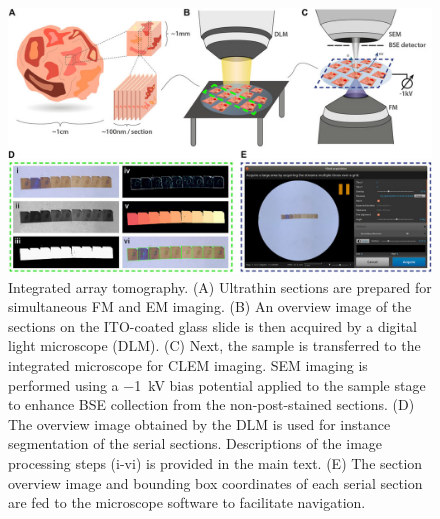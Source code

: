 \begin{figure}[!tb]
    \centering
    \includegraphics[width=\linewidth]{chapter-3/figures_JPEG_LQ/fig3-1_workflow.jpg}
    \caption{Integrated array tomography.
    (A) Ultrathin sections are prepared for simultaneous FM and EM imaging.
    (B) An overview image of the sections on the ITO-coated glass slide is then acquired by a digital light microscope (DLM).
    (C) Next, the sample is transferred to the integrated microscope for CLEM imaging. SEM imaging is performed using a \SI{-1}{\kilo\volt} bias potential applied to the sample stage to enhance BSE collection from the non-post-stained sections.
    (D) The overview image obtained by the DLM is used for instance segmentation of the serial sections. Descriptions of the image processing steps (i-vi) is provided in the main text.
    (E) The section overview image and bounding box coordinates of each serial section are fed to the microscope software to facilitate navigation.}
    \label{fig:3.1_workflow}
\end{figure}


